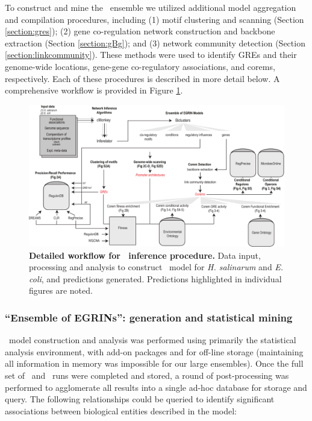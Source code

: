To construct and mine the \egrine~ensemble we utilized additional
model aggregation and compilation procedures, including (1) motif
clustering \cite{vanDongen2012} and scanning \cite{Bailey1998}
(Section \ref{section:gres}); (2) gene co-regulation network
construction and backbone extraction \cite{Serrano2009}
(Section \ref{section:gBg}); and (3) network community
detection \cite{Ahn2010} (Section \ref{section:linkcommunity}). These
methods were used to identify GREs and their genome-wide locations,
gene-gene co-regulatory associations, and corems, respectively. Each
of these procedures is described in more detail below. A comprehensive
workflow is provided in Figure \ref{fig:workflow}.

\begin{figure}[h!]
\centering
\includegraphics[width=\linewidth]{figures/workflow.pdf}
\caption[Detailed workflow for \egrine~inference procedure]{
{\bf Detailed workflow for \egrine~inference procedure.} Data input,
processing and analysis to construct \egrine~model for {\it
H. salinarum} and {\it E. coli}, and predictions
generated. Predictions highlighted in individual figures are noted.}
\label{fig:workflow}
\end{figure}

\subsubsection{``Ensemble of EGRINs'': generation and statistical mining}

\egrine~model construction and analysis was performed using
primarily the  statistical analysis environment, with add-on
packages  and  for off-line
storage (maintaining all information in memory was impossible for our
large ensembles). Once the full set of \cm\ and \nwinf\ runs were
completed and stored, a round of post-processing was performed to
agglomerate all results into a single ad-hoc database for storage and
query. The following relationships could be queried to identify
significant associations between biological entities described in the
model:

